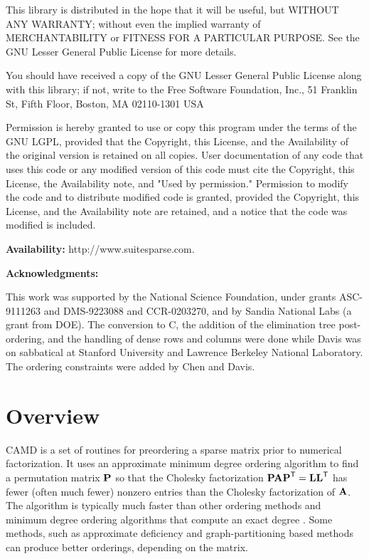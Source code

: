 \documentclass[11pt]{article}
\newcommand{\m}[1]{{\bf{#1}}}       %
\newcommand{\tr}{^{\sf T}}          %
\begin{document}
    This library is distributed in the hope that it will be useful,
    but WITHOUT ANY WARRANTY; without even the implied warranty of
    MERCHANTABILITY or FITNESS FOR A PARTICULAR PURPOSE.  See the GNU
    Lesser General Public License for more details.

    You should have received a copy of the GNU Lesser General Public
    License along with this library; if not, write to the Free Software
    Foundation, Inc., 51 Franklin St, Fifth Floor, Boston, MA  02110-1301
    USA

    Permission is hereby granted to use or copy this program under the
    terms of the GNU LGPL, provided that the Copyright, this License,
    and the Availability of the original version is retained on all copies.
    User documentation of any code that uses this code or any modified
    version of this code must cite the Copyright, this License, the
    Availability note, and "Used by permission." Permission to modify
    the code and to distribute modified code is granted, provided the
    Copyright, this License, and the Availability note are retained,
    and a notice that the code was modified is included.

{\bf Availability:}
    http://www.suitesparse.com.

{\bf Acknowledgments:}

    This work was supported by the National Science Foundation, under
    grants ASC-9111263 and DMS-9223088 and CCR-0203270, and by Sandia
    National Labs (a grant from DOE).
    The conversion to C, the addition of the elimination tree
    post-ordering, and the handling of dense rows and columns
    were done while Davis was on sabbatical at
    Stanford University and Lawrence Berkeley National Laboratory.
    The ordering constraints were added by Chen and Davis.

\newpage
\section{Overview}

CAMD is a set of routines for preordering a sparse matrix prior to
numerical factorization.  It uses an approximate minimum degree ordering
algorithm \cite{AmestoyDavisDuff96,AmestoyDavisDuff04}
to find a permutation matrix $\m{P}$
so that the Cholesky factorization $\m{PAP}\tr=\m{LL}\tr$ has fewer
(often much fewer) nonzero entries than the Cholesky factorization of $\m{A}$.
The algorithm is typically much faster than other ordering methods
and  minimum degree ordering
algorithms that compute an exact degree \cite{GeorgeLiu89}.
Some methods, such as approximate deficiency
\cite{RothbergEisenstat98} and graph-partitioning based methods
\cite{Chaco,KarypisKumar98e,PellegriniRomanAmestoy00,schu:01}
can produce better orderings, depending on the matrix.
\end{document}
